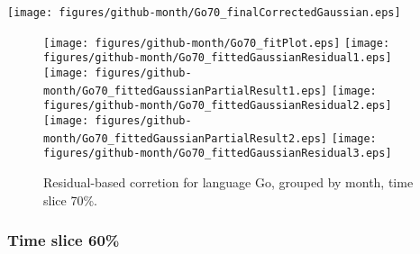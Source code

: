 \begin{center}
{\texttt{[image: figures/github-month/Go70\_finalCorrectedGaussian.eps]}}
\end{center}

\FloatBarrier

\begin{figure}[t]
\centering
{}
{\texttt{[image: figures/github-month/Go70\_fitPlot.eps]}}
{\texttt{[image: figures/github-month/Go70\_fittedGaussianResidual1.eps]}}
{\texttt{[image: figures/github-month/Go70\_fittedGaussianPartialResult1.eps]}}
{\texttt{[image: figures/github-month/Go70\_fittedGaussianResidual2.eps]}}
{\texttt{[image: figures/github-month/Go70\_fittedGaussianPartialResult2.eps]}}
{\texttt{[image: figures/github-month/Go70\_fittedGaussianResidual3.eps]}}
\caption{Residual-based corretion for language Go, grouped by month, time slice 70\%.}
\end{figure}


\FloatBarrier


\subsubsection{Time slice 60\%}


